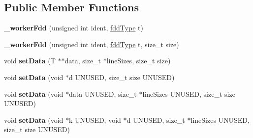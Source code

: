 \subsection*{Public Member Functions}
\begin{DoxyCompactItemize}
\item 
\hypertarget{classfaster_1_1__workerFdd_3_01T_01_5_01_4_a47e31872160658985595a45cb4a546a7}{}\label{classfaster_1_1__workerFdd_3_01T_01_5_01_4_a47e31872160658985595a45cb4a546a7} 
{\bfseries \+\_\+worker\+Fdd} (unsigned int ident, \hyperlink{namespacefaster_aa8898687bc64536b60a3d5f365060cd6}{fdd\+Type} t)
\item 
\hypertarget{classfaster_1_1__workerFdd_3_01T_01_5_01_4_a9bdf0205db584c51f2160d158629b979}{}\label{classfaster_1_1__workerFdd_3_01T_01_5_01_4_a9bdf0205db584c51f2160d158629b979} 
{\bfseries \+\_\+worker\+Fdd} (unsigned int ident, \hyperlink{namespacefaster_aa8898687bc64536b60a3d5f365060cd6}{fdd\+Type} t, size\+\_\+t size)
\item 
\hypertarget{classfaster_1_1__workerFdd_3_01T_01_5_01_4_a6c828c7980659ae657bae25e4bbbf7b0}{}\label{classfaster_1_1__workerFdd_3_01T_01_5_01_4_a6c828c7980659ae657bae25e4bbbf7b0} 
void {\bfseries set\+Data} (T $\ast$$\ast$data, size\+\_\+t $\ast$line\+Sizes, size\+\_\+t size)
\item 
\hypertarget{classfaster_1_1__workerFdd_3_01T_01_5_01_4_ad6c9ec2e14d529ef574ed3031749baf1}{}\label{classfaster_1_1__workerFdd_3_01T_01_5_01_4_ad6c9ec2e14d529ef574ed3031749baf1} 
void {\bfseries set\+Data} (void $\ast$d U\+N\+U\+S\+ED, size\+\_\+t size U\+N\+U\+S\+ED)
\item 
\hypertarget{classfaster_1_1__workerFdd_3_01T_01_5_01_4_ab0b7a6bb56047036f6bf2a30f509303f}{}\label{classfaster_1_1__workerFdd_3_01T_01_5_01_4_ab0b7a6bb56047036f6bf2a30f509303f} 
void {\bfseries set\+Data} (void $\ast$data U\+N\+U\+S\+ED, size\+\_\+t $\ast$line\+Sizes U\+N\+U\+S\+ED, size\+\_\+t size U\+N\+U\+S\+ED)
\item 
\hypertarget{classfaster_1_1__workerFdd_3_01T_01_5_01_4_a697ae8111ed8aaad17c1d739894e449f}{}\label{classfaster_1_1__workerFdd_3_01T_01_5_01_4_a697ae8111ed8aaad17c1d739894e449f} 
void {\bfseries set\+Data} (void $\ast$k U\+N\+U\+S\+ED, void $\ast$d U\+N\+U\+S\+ED, size\+\_\+t $\ast$line\+Sizes U\+N\+U\+S\+ED, size\+\_\+t size U\+N\+U\+S\+ED)
\item 
\hypertarget{classfaster_1_1__workerFdd_3_01T_01_5_01_4_a4718bba9d9bf44a30c74bd38b426a9cd}{}\label{classfaster_1_1__workerFdd_3_01T_01_5_01_4_a4718bba9d9bf44a30c74bd38b426a9cd} 
$$
\end{DoxyCompactItemize}
